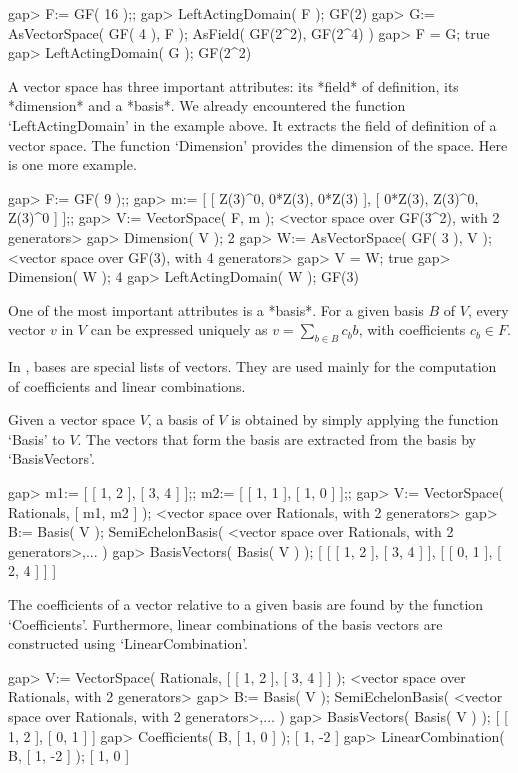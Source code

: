 \beginexample
gap> F:= GF( 16 );;
gap> LeftActingDomain( F );
GF(2)
gap> G:= AsVectorSpace( GF( 4 ), F );       
AsField( GF(2^2), GF(2^4) )
gap> F = G;
true
gap> LeftActingDomain( G );
GF(2^2)
\endexample

A vector space has three important attributes: its *field* of definition,
its *dimension* and a *basis*. We already encountered the function 
`LeftActingDomain' in the example above. It extracts the field of definition
of a vector space.
The function `Dimension' provides the dimension of the space.
Here is one more example.

\beginexample
gap> F:= GF( 9 );;
gap> m:= [ [ Z(3)^0, 0*Z(3), 0*Z(3) ], [ 0*Z(3), Z(3)^0, Z(3)^0 ] ];;
gap> V:= VectorSpace( F, m );
<vector space over GF(3^2), with 2 generators>
gap> Dimension( V );
2
gap> W:= AsVectorSpace( GF( 3 ), V );
<vector space over GF(3), with 4 generators>
gap> V = W;
true
gap> Dimension( W );
4
gap> LeftActingDomain( W );
GF(3)
\endexample

One of the most important attributes is a *basis*. For a given basis $B$ of 
$V$, every vector $v$ in $V$ can be expressed uniquely as 
$v = \sum_{b \in B} c_b b$, with coefficients $c_b \in F$.

In {\GAP}, bases are special lists of vectors.
They are used mainly for the computation of coefficients and linear
combinations. 

Given a vector space $V$, a basis of $V$ is obtained by
simply applying the function `Basis' to $V$. The vectors that form
the basis are extracted from the basis by `BasisVectors'. 

\beginexample
gap> m1:= [ [ 1, 2 ], [ 3, 4 ] ];; m2:= [ [ 1, 1 ], [ 1, 0 ] ];;
gap> V:= VectorSpace( Rationals, [ m1, m2 ] );
<vector space over Rationals, with 2 generators>
gap> B:= Basis( V );
SemiEchelonBasis( <vector space over Rationals, with 2 generators>,... )
gap> BasisVectors( Basis( V ) );
[ [ [ 1, 2 ], [ 3, 4 ] ], [ [ 0, 1 ], [ 2, 4 ] ] ]
\endexample

The coefficients of 
a vector relative to a given basis are found by the function
`Coefficients'. Furthermore, linear combinations of the basis vectors
are constructed using `LinearCombination'.

\beginexample
gap> V:= VectorSpace( Rationals, [ [ 1, 2 ], [ 3, 4 ] ] );
<vector space over Rationals, with 2 generators>
gap> B:= Basis( V );
SemiEchelonBasis( <vector space over Rationals, with 2 generators>,... )
gap> BasisVectors( Basis( V ) );
[ [ 1, 2 ], [ 0, 1 ] ]
gap> Coefficients( B, [ 1, 0 ] );
[ 1, -2 ]
gap> LinearCombination( B, [ 1, -2 ] );
[ 1, 0 ]
\endexample

